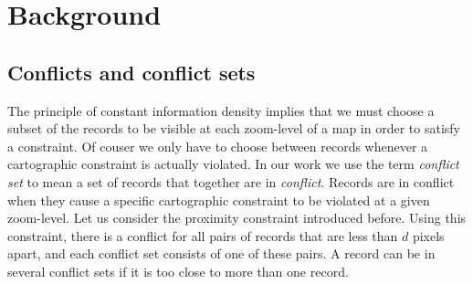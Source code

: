 \section{Background}
\label{sec:background}




\subsection{Conflicts and conflict sets}
\label{sec:conflicts}
The principle of constant information density implies that we must choose a subset of the records to be visible at each zoom-level of a map in order to satisfy a constraint. Of couser we only have to choose between records whenever a cartographic constraint is actually violated. In our work we use the term \emph{conflict set} to mean a set of records that together are in \emph{conflict}. Records are in conflict when they cause a specific cartographic constraint to be violated at a given zoom-level. Let us consider the proximity constraint introduced before. Using this constraint, there is a conflict for all pairs of records that are less than $d$ pixels apart, and each conflict set consists of one of these pairs. A record can be in several conflict sets if it is too close to more than one record.




